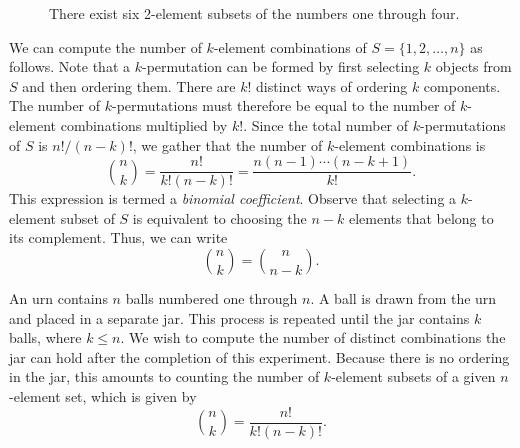 \begin{figure}[htb!]
\begin{center}
\begin{footnotesize}
\end{footnotesize}
\caption{There exist six 2-element subsets of the numbers one through four.}
\label{figure:Combination}
\end{center}
\end{figure}

We can compute the number of $k$-element combinations of $S = \{ 1, 2, \ldots, n \}$ as follows.
Note that a $k$-permutation can be formed by first selecting $k$ objects from $S$ and then ordering them.
There are $k!$ distinct ways of ordering $k$ components.
The number of $k$-permutations must therefore be equal to the number of $k$-element combinations multiplied by $k!$.
Since the total number of $k$-permutations of $S$ is $n! / (n-k)!$, we gather that the number of $k$-element combinations is
\begin{equation*}
\binom{n}{k} = \frac{n!}{k! (n-k)!} = \frac{ n (n-1) \cdots (n-k+1) }{ k! } .
\end{equation*}
This expression is termed a \emph{binomial coefficient}. 
Observe that selecting a $k$-element subset of $S$ is equivalent to choosing the $n-k$ elements that belong to its complement.
Thus, we can write
\begin{equation*}
\binom{n}{k} = \binom{n}{n-k} .
\end{equation*}

\begin{example}
An urn contains $n$ balls numbered one through $n$.
A ball is drawn from the urn and placed in a separate jar.
This process is repeated until the jar contains $k$ balls, where $k \leq n$.
We wish to compute the number of distinct combinations the jar can hold after the completion of this experiment.
Because there is no ordering in the jar, this amounts to counting the number of $k$-element subsets of a given $n$-element set, which is given by
\begin{equation*}
\binom{n}{k} = \frac{n!}{k! (n-k)!}.
\end{equation*}
\end{example}

